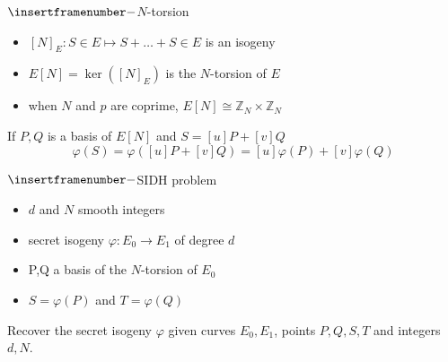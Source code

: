 \documentclass[10pt]{beamer}
\theoremstyle{plain}
\theoremstyle{example}
\begin{document}

\begin{frame}{$\insertframenumber -$$N$-torsion}
		\begin{itemize}
			\item $[N]_E:S\in E\longmapsto S+\dots+S\in E$ is an isogeny 
			\item $E[N]=\ker([N]_E)$ is the $N$-torsion of $E$
			\item when $N$ and $p$ are coprime, $E[N]\cong \mathbb Z_N\times\mathbb Z_N$
		\end{itemize}	
		\vspace{1cm}
		If $P,Q$ is a basis of $E[N]$ and $S=[u]P + [v]Q$
		\[
			\varphi(S)=\varphi([u]P+[v]Q)=[u]\varphi(P)+[v]\varphi(Q)
		\] 
\end{frame}


\begin{frame}{$\insertframenumber -$SIDH problem}

	\begin{itemize}
		\item $d$ and $N$ smooth integers 
		\item secret isogeny $\varphi:E_0\to E_1$ of degree $d$
		\item P,Q a basis of the $N$-torsion of $E_0$
		\item $S = \varphi(P)$ and  $T=\varphi(Q)$
	\end{itemize}
	\begin{problem}
		Recover the secret isogeny $\varphi$ given curves $E_0,E_1$, points $P,Q,S,T$ and
		integers $d,N$.
	\end{problem}
	\vspace{0.5cm}

\end{frame}
\end{document}
